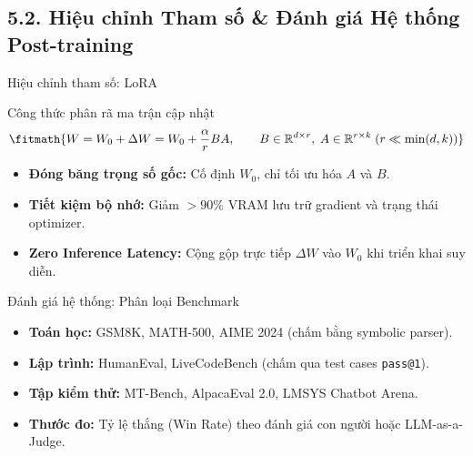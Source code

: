 \subsection{5.2. Hiệu chỉnh Tham số \& Đánh giá Hệ thống Post-training}

\begin{frame}{Hiệu chỉnh tham số: LoRA}
  \begin{block}{Công thức phân rã ma trận cập nhật}
    \[
      \fitmath{%
      W = W_0 + \Delta W = W_0 + \frac{\alpha}{r} B A, \qquad B \in \mathbb{R}^{d \times r}, \; A \in \mathbb{R}^{r \times k} \; (r \ll \min(d, k))
      }
    \]
  \end{block}

  \small
  \begin{itemize}\setlength{\itemsep}{5pt}
    \item \textbf{Đóng băng trọng số gốc:} Cố định $W_0$, chỉ tối ưu hóa $A$ và $B$.
    \item \textbf{Tiết kiệm bộ nhớ:} Giảm $>90\%$ VRAM lưu trữ gradient và trạng thái optimizer.
    \item \textbf{Zero Inference Latency:} Cộng gộp trực tiếp $\Delta W$ vào $W_0$ khi triển khai suy diễn.
  \end{itemize}
  \par\vspace{0pt}
\end{frame}

\begin{frame}{Đánh giá hệ thống: Phân loại Benchmark}
  \small
  \begin{itemize}\setlength{\itemsep}{2pt}
    \item \textbf{Toán học:} GSM8K, MATH-500, AIME 2024 (chấm bằng symbolic parser).
    \item \textbf{Lập trình:} HumanEval, LiveCodeBench (chấm qua test cases \texttt{pass@1}).
  \end{itemize}

  \vspace{0.12cm}
  \small
  \begin{itemize}\setlength{\itemsep}{2pt}
    \item \textbf{Tập kiểm thử:} MT-Bench, AlpacaEval 2.0, LMSYS Chatbot Arena.
    \item \textbf{Thước đo:} Tỷ lệ thắng (Win Rate) theo đánh giá con người hoặc LLM-as-a-Judge.
  \end{itemize}
  \par\vspace{0pt}
\end{frame}

